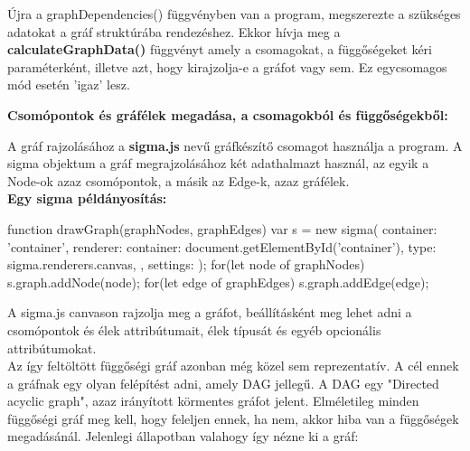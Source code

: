 Újra a graphDependencies() függvényben van a program, megszerezte a szükséges adatokat a gráf struktúrába rendezéshez. Ekkor hívja meg a \textbf{calculateGraphData()} függvényt amely a csomagokat, a függőségeket kéri paraméterként, illetve azt, hogy kirajzolja-e a gráfot vagy sem. Ez egycsomagos mód esetén 'igaz' lesz.

\noindent\textbf{Csomópontok és gráfélek megadása, a csomagokból és függőségekből:}


A gráf rajzolásához a \textbf{sigma.js} nevű gráfkészítő csomagot használja a program. A sigma objektum a gráf megrajzolásához két adathalmazt használ, az egyik a Node-ok azaz csomópontok, a másik az Edge-k, azaz gráfélek.\\

\textbf{Egy sigma példányosítás:
}
\begin{js}
function drawGraph(graphNodes, graphEdges){	
	var s = new sigma({ 
		container: 'container',
		renderer: {
			container: document.getElementById('container'),
			type: sigma.renderers.canvas,
		},
		settings: {}
	});
	for(let node of graphNodes){
		s.graph.addNode(node);
	}
	for(let edge of graphEdges){
		s.graph.addEdge(edge);
	}
}
\end{js}

A sigma.js canvason rajzolja meg a gráfot, beállításként meg lehet adni a csomópontok és élek attribútumait, élek típusát és egyéb opcionális attribútumokat.\\

Az így feltöltött függőségi gráf azonban még közel sem reprezentatív. A cél ennek a gráfnak egy olyan felépítést adni, amely DAG jellegű. A DAG egy "Directed acyclic graph", azaz irányított körmentes gráfot jelent. Elméletileg minden függőségi gráf meg kell, hogy feleljen ennek, ha nem, akkor hiba van a függőségek megadásánál. Jelenlegi állapotban valahogy így nézne ki a gráf:\\


